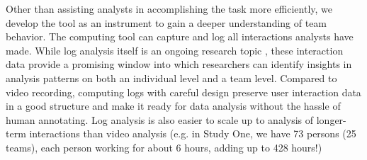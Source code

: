 Other than assisting analysts in accomplishing the task more efficiently, we develop the tool as an instrument to gain a deeper understanding of team behavior. The computing tool can capture and log all interactions analysts have made. While log analysis itself is an ongoing research topic \citep{Yi2007, Guo2016}, these interaction data provide a promising window into which researchers can identify insights in analysis patterns on both an individual level and a team level. Compared to video recording, computing logs with careful design preserve user interaction data in a good structure and make it ready for data analysis without the hassle of human annotating. Log analysis is also easier to scale up to analysis of longer-term interactions than video analysis (e.g. in Study One, we have 73 persons (25 teams),  each person working for about 6 hours, adding up to 428 hours!)
